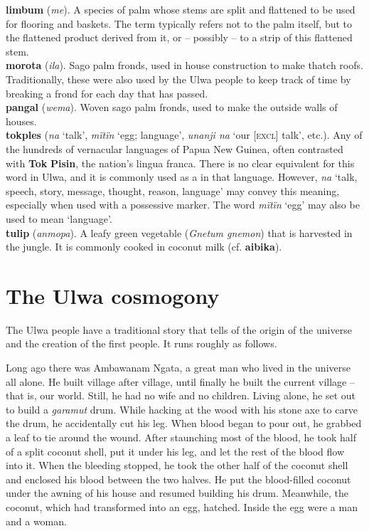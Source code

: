 \largerpage
\noindent \textbf{limbum} (\textit{me}). A species of palm whose stems are split and flattened to be used for flooring and baskets. The term typically refers not to the palm itself, but to the flattened product derived from it, or – possibly – to a strip of this flattened stem.\\

\noindent \textbf{morota} (\textit{ila}). Sago palm fronds, used in house construction to make thatch roofs. Traditionally, these were also used by the Ulwa people to keep track of time by breaking a frond for each day that has passed.\\

\noindent \textbf{pangal} (\textit{wema}). Woven sago palm fronds, used to make the outside walls of houses.\\

\noindent \textbf{tokples} (\textit{na} ‘talk’, \textit{mïtïn} ‘egg; language’, \textit{unanji na} ‘our [\textsc{excl]} talk’, etc.). Any of the hundreds of vernacular languages of Papua New Guinea, often contrasted with \textbf{Tok} \textbf{Pisin}, the nation’s lingua franca. There is no clear equivalent for this word in Ulwa, and it is commonly used as a  in that language. However, \textit{na} ‘talk, speech, story, message, thought, reason, language’ may convey this meaning, especially when used with a possessive marker. The word \textit{mïtïn} ‘egg’ may also be used to mean ‘language’.\\

\noindent \textbf{tulip} (\textit{anmopa}). A leafy green vegetable (\textit{Gnetum gnemon}) that is harvested in the jungle. It is commonly cooked in coconut milk (cf. \textbf{aibika}).\\

\chapter{The Ulwa cosmogony}\label{sec:app.f}

The Ulwa people have a traditional story that tells of the origin of the universe and the creation of the first people. It runs roughly as follows.

  Long ago there was Ambawanam Ngata, a great man who lived in the universe all alone. He built village after village, until finally he built the current village -- that is, our world. Still, he had no wife and no children. Living alone, he set out to build a \textit{garamut} drum. While hacking at the wood with his stone axe to carve the drum, he accidentally cut his leg. When blood began to pour out, he grabbed a leaf to tie around the wound. After staunching most of the blood, he took half of a split coconut shell, put it under his leg, and let the rest of the blood flow into it. When the bleeding stopped, he took the other half of the coconut shell and enclosed his blood between the two halves. He put the blood-filled coconut under the awning of his house and resumed building his drum. Meanwhile, the coconut, which had transformed into an egg, hatched. Inside the egg were a man and a woman.


